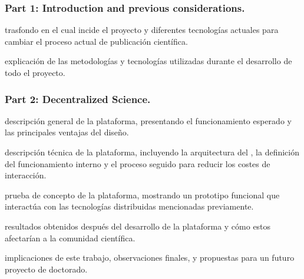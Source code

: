 \subsubsection*{Part 1: Introduction and previous considerations.}
\begin{itemize}
   trasfondo en
  el cual incide el proyecto y diferentes tecnologías actuales para
  cambiar el proceso actual de publicación científica.

   explicación de  las
  metodologías y tecnologías utilizadas durante el desarrollo de todo el
  proyecto.
  
\end{itemize}
\subsubsection*{Part 2: Decentralized Science.}
\begin{itemize}
   descripción general de la plataforma, presentando
  el funcionamiento esperado y las principales ventajas del diseño.
  
   descripción técnica de la plataforma, incluyendo la
  arquitectura del , la definición del funcionamiento interno y el
  proceso seguido para reducir los costes de interacción.
  
   prueba de concepto de la plataforma, mostrando un prototipo
  funcional que interactúa con las tecnologías distribuidas mencionadas previamente.

   resultados obtenidos después del desarrollo de la
  plataforma y cómo estos afectarían a la comunidad científica.

   implicaciones de este trabajo,
  observaciones finales, y propuestas para un futuro proyecto de doctorado.
\end{itemize}

